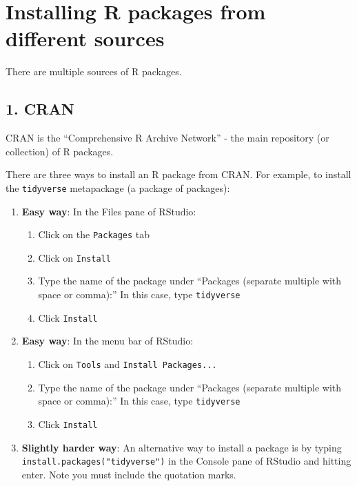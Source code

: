 \documentclass[
]{book}
\providecommand{\tightlist}{%
  \setlength{\itemsep}{0pt}\setlength{\parskip}{0pt}}
\begin{document}
\hypertarget{installing-r-packages-from-different-sources}{%
\section{Installing R packages from different sources}\label{installing-r-packages-from-different-sources}}

There are multiple sources of R packages.

\hypertarget{cran}{%
\subsection*{1. CRAN}\label{cran}}

CRAN is the ``Comprehensive R Archive Network'' - the main repository (or collection) of R packages.

There are three ways to install an R package from CRAN. For example, to install the \texttt{tidyverse} metapackage (a package of packages):

\begin{enumerate}
\def\labelenumi{\arabic{enumi}.}
\tightlist
\item
  \textbf{Easy way}: In the Files pane of RStudio:

  \begin{enumerate}
  \def\labelenumii{\alph{enumii}.}
  \tightlist
  \item
    Click on the \texttt{Packages} tab
  \item
    Click on \texttt{Install}
  \item
    Type the name of the package under ``Packages (separate multiple with space or comma):'' In this case, type \texttt{tidyverse}
  \item
    Click \texttt{Install}
  \end{enumerate}
\item
  \textbf{Easy way}: In the menu bar of RStudio:

  \begin{enumerate}
  \def\labelenumii{\alph{enumii}.}
  \tightlist
  \item
    Click on \texttt{Tools} and \texttt{Install\ Packages...}
  \item
    Type the name of the package under ``Packages (separate multiple with space or comma):'' In this case, type \texttt{tidyverse}
  \item
    Click \texttt{Install}
  \end{enumerate}
\item
  \textbf{Slightly harder way}: An alternative way to install a package is by typing \texttt{install.packages("tidyverse")} in the Console pane of RStudio and hitting enter. Note you must include the quotation marks.
\end{enumerate}
\end{document}
